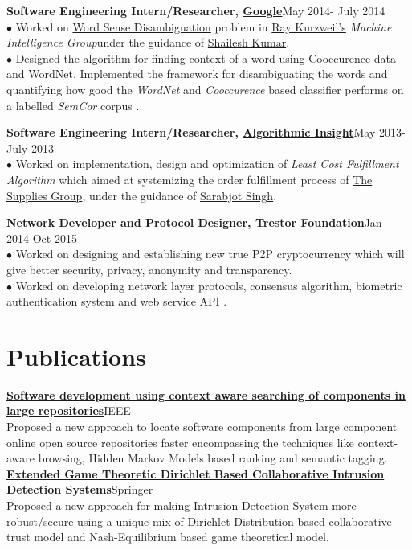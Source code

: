 \documentclass[margin,line]{resume}
\begin{document}
\begin{resume}
      {\bf Software Engineering Intern/Researcher, \href{https://www.google.com/}{Google}}\hfill May 2014- July 2014\\
      $\bullet$ Worked on \href{https://en.wikipedia.org/wiki/Word-sense_disambiguation}{Word Sense Disambiguation} problem in \href{http://en.wikipedia.org/wiki/Ray_Kurzweil}{Ray Kurzweil's} \emph{Machine Intelligence Group}\linebreak under the guidance of \href{http://research.google.com/pubs/ShaileshKumar.html}{Shailesh Kumar}.\nolinebreak\\
	$\bullet$ Designed the algorithm for finding context of a word using Cooccurence data and WordNet. Implemented the framework for disambiguating the words and quantifying how good the \emph{WordNet} and \emph{Cooccurence} based classifier performs on a labelled \emph{SemCor} corpus .
    
     {\bf Software Engineering Intern/Researcher, \href{http://algorithmicinsight.com/}{Algorithmic Insight}}\hfill May 2013- July 2013\\
      $\bullet$ Worked on implementation, design and optimization of \emph{Least Cost Fulfillment Algorithm} which aimed at systemizing the order fulfillment process of \href{http://www.suppliesguys.com/}{The Supplies Group}, under the guidance of \href{https://www.linkedin.com/in/sarabjot-singh-a130711}{Sarabjot Singh}.

 {\bf Network Developer and Protocol Designer, \href{http://trestor.org/}{Trestor Foundation}}\hfill Jan 2014-Oct 2015\\
	$\bullet$ Worked on designing and establishing new true P2P cryptocurrency which will give better security, privacy, anonymity and transparency. \\
$\bullet$ Worked on developing network layer protocols, consensus algorithm, biometric authentication \linebreak system and web service API . 

\section{\mysidestyle \bf Publications} 
 {\bf\href{http://ieeexplore.ieee.org/document/7148513/?arnumber=7148513}{Software development using context aware searching of components in large repositories}}\hfill IEEE \\
Proposed a  new approach to locate software components from large component online open source repositories faster encompassing the techniques like context-aware browsing, Hidden Markov Models based ranking and semantic tagging.
\pagebreak\\
{\bf\href{http://link.springer.com/chapter/10.1007/978-981-10-0251-9_32}{Extended Game Theoretic Dirichlet Based Collaborative Intrusion Detection Systems}}\hfill Springer \\
Proposed a  new approach for making Intrusion Detection System more robust/secure using a unique mix of Dirichlet Distribution based collaborative trust model and Nash-Equilibrium based game theoretical model. 


\end{resume}
\end{document}
